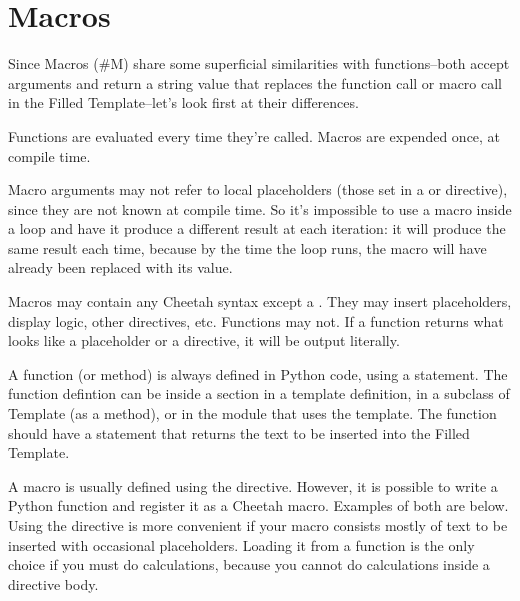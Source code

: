 \section{Macros}
\label{macros}


Since Macros (\#M) share some superficial similarities with functions--both
accept arguments and return a string value that replaces the function call or
macro call in the Filled Template--let's look first at their differences.

Functions are evaluated every time they're called.  Macros are expended once,
at compile time.  

Macro arguments may not refer to local placeholders (those set in a
 or  directive), since they are not known at compile
time.  So it's impossible to use a macro inside a  loop and have
it produce a different result at each iteration: it will produce the same 
result each time, because by the time the  loop runs, the macro will
have already been replaced with its value.

Macros may contain any Cheetah syntax except a .  They
may insert placeholders, display logic, other directives, etc.  Functions may
not.  If a function returns what looks like a placeholder or a directive, it
will be output literally.

A function (or method) is always defined in Python code, using a 
statement.  The function defintion can be inside a  section in
a template definition, in a subclass of Template (as a method), or in the
module that uses the template.  The function should have a 
statement that returns the text to be inserted into the Filled Template.

A macro is usually defined using the  directive.  However, it is
possible to write a Python function and register it as a Cheetah macro.
Examples of both are below.  Using the  directive is more
convenient if your macro consists mostly of text to be inserted with occasional
placeholders.  Loading it from a function is the only choice if you must do
calculations, because you cannot do calculations inside a 
directive body.


